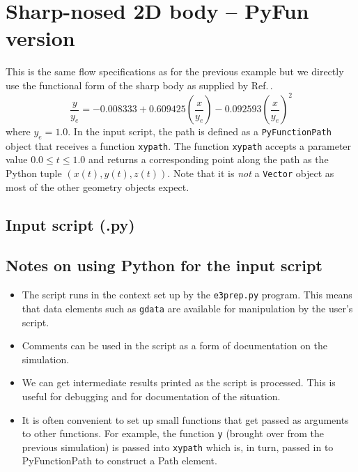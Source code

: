 
\section{Sharp-nosed 2D body -- PyFun version}
%
This is the same flow specifications as for the previous example
but we directly use the functional form of the sharp body as supplied
by Ref.\,\cite{anderson_89}.
$$
\frac{y}{y_e} = -0.008333 + 0.609425 \left( \frac{x}{y_e} \right)
                - 0.092593 \left( \frac{x}{y_e} \right)^2
$$
where $y_e = 1.0$.
In the input script, the path is defined as a \texttt{PyFunctionPath} object that
receives a function \texttt{xypath}.
The function \texttt{xypath} accepts a parameter value $0.0 \le t \le 1.0$ and returns a 
corresponding point along the path as the Python tuple $(x(t), y(t), z(t))$.
Note that it is \textit{not} a \texttt{Vector} object as most of the other geometry objects expect.

\bigskip
\subsection{Input script (.py)}
\topbar

\bottombar

\subsection{Notes on using Python for the input script}
\begin{itemize}
 \item The script runs in the context set up by the \texttt{e3prep.py} program.
  This means that data elements such as \texttt{gdata} are available for manipulation
  by the user's script.
 \item Comments can be used in the script as a form of documentation on the simulation.
 \item We can get intermediate results printed as the script is processed.  
  This is useful for debugging and for documentation of the situation.
 \item It is often convenient to set up small functions that get passed as arguments to
  other functions.  For example, the function \texttt{y} (brought over from the previous
  simulation) is passed into \texttt{xypath} which is, in turn, passed in to PyFunctionPath
  to construct a Path element. 
\end{itemize}
